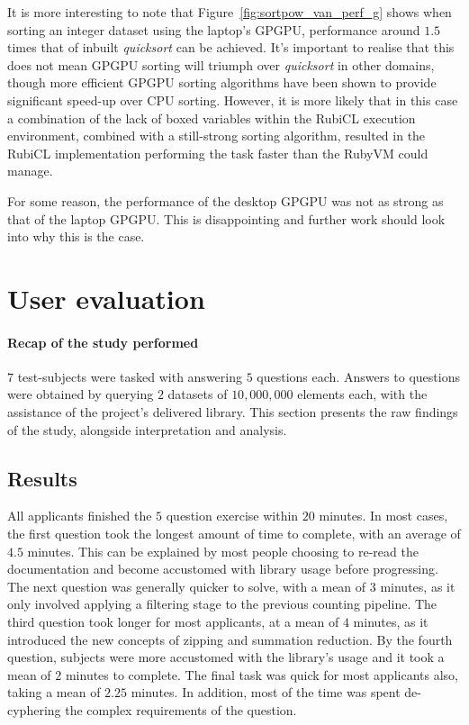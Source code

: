 It is more interesting to note that Figure~\ref{fig:sortpow_van_perf_g} shows when sorting an integer dataset using the laptop's \ac{GPGPU}, performance around $1.5$ times that of inbuilt \emph{quicksort} can be achieved. It's important to realise that this does not mean \ac{GPGPU} sorting will triumph over \emph{quicksort} in other domains, though more efficient \ac{GPGPU} sorting algorithms have been shown to provide significant speed-up over \ac{CPU} sorting\cite{sintorn2008fast}. However, it is more likely that in this case a combination of the lack of boxed variables within the RubiCL execution environment, combined with a still-strong sorting algorithm, resulted in the RubiCL implementation performing the task faster than the RubyVM could manage.

For some reason, the performance of the desktop \ac{GPGPU} was not as strong as that of the laptop \ac{GPGPU}. This is disappointing and further work should look into why this is the case.
\section{User evaluation}
\paragraph*{Recap of the study performed}
$7$ test-subjects were tasked with answering $5$ questions each. Answers to questions were obtained by querying $2$ datasets of $10,000,000$ elements each, with the assistance of the project's delivered library. This section presents the raw findings of the study, alongside interpretation and analysis.

\subsection{Results}
All applicants finished the $5$ question exercise within $20$ minutes. In most cases, the first question took the longest amount of time to complete, with an average of $4.5$ minutes. This can be explained by most people choosing to re-read the documentation and become accustomed with library usage before progressing. The next question was generally quicker to solve, with a mean of $3$ minutes, as it only involved applying a filtering stage to the previous counting pipeline. The third question took longer for most applicants, at a mean of $4$ minutes, as it introduced the new concepts of zipping and summation reduction. By the fourth question, subjects were more accustomed with the library's usage and it took a mean of $2$ minutes to complete. The final task was quick for most applicants also, taking a mean of $2.25$ minutes. In addition, most of the time was spent de-cyphering the complex requirements of the question.

